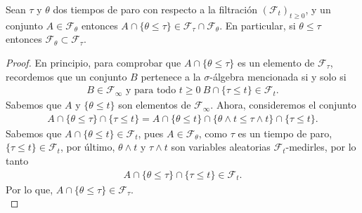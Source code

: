\begin{lemma}
	\label{sigmaparadasubset}
	Sean $\tau$ y $\theta$ dos tiempos de paro con respecto a la filtración $(\mathcal{F}_t)_{t \geq 0}$, y un conjunto $A \in \mathcal{F}_{\theta}$ entonces $A \cap \{\theta \leq \tau\} \in \mathcal{F}_{\tau} \cap \mathcal{F}_{\theta}$. En particular, si $\theta \leq \tau$ entonces $\mathcal{F}_{\theta} \subset \mathcal{F}_{\tau}$.
\end{lemma}
\begin{proof}
	En principio, para comprobar que $A \cap \{\theta \leq \tau\}$ es un elemento de $\mathcal{F}_{\tau}$, recordemos que un conjunto $B$ pertenece a la $\sigma$-álgebra mencionada si y solo si
	\begin{align*}
		B \in \mathcal{F}_{\infty} \text{  y para todo  } t \geq 0 \ B \cap \{\tau \leq t\} \in \mathcal{F}_t.
	\end{align*}
	Sabemos que $A$ y $\{\theta \leq t\}$ son elementos de $\mathcal{F}_{\infty}$. Ahora, consideremos el conjunto
	\begin{align*}
		A \cap \{ \theta \leq \tau\} \cap \{\tau \leq t\} = A \cap \{\theta \leq t\} \cap \{\theta \wedge t \leq \tau \wedge t\} \cap \{\tau \leq t\}.
	\end{align*}
	Sabemos que $A \cap \{\theta \leq t\} \in \mathcal{F}_t$, pues $A \in \mathcal{F}_{\theta}$, como $\tau$ es un tiempo de paro, $\{\tau \leq t\} \in \mathcal{F}_t$, por último, $\theta \wedge t$ y $\tau \wedge t$ son variables aleatorias $\mathcal{F}_t$-medirles, por lo tanto
	\begin{align*}
		A \cap \{ \theta \leq \tau\} \cap \{\tau \leq t\} \in \mathcal{F}_t.
	\end{align*}
	Por lo que, $A \cap \{\theta \leq \tau\} \in \mathcal{F}_{\tau}$. \\


\end{proof}
